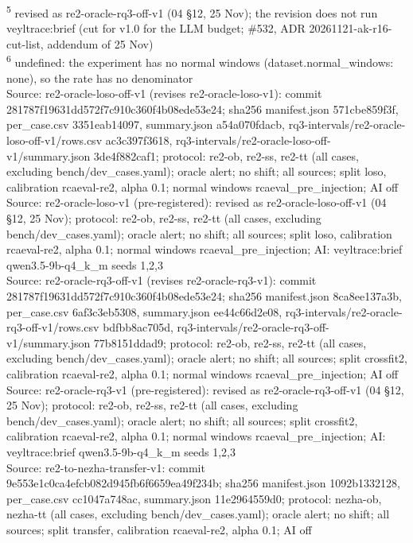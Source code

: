\begin{table}[t]
\textsuperscript{5} revised as re2-oracle-rq3-off-v1 (04 \S{}12, 25 Nov); the revision does not run veyltrace:brief (cut for v1.0 for the LLM budget; \#532, ADR 20261121-ak-r16-cut-list, addendum of 25 Nov)\\
\textsuperscript{6} undefined: the experiment has no normal windows (dataset.normal\_windows: none), so the rate has no denominator\\
Source: re2-oracle-loso-off-v1 (revises re2-oracle-loso-v1): commit 281787f19631dd572f7c910c360f4b08ede53e24; sha256 manifest.json 571cbe859f3f, per\_case.csv 3351eab14097, summary.json a54a070fdacb, rq3-intervals/re2-oracle-loso-off-v1/rows.csv ac3c397f3618, rq3-intervals/re2-oracle-loso-off-v1/summary.json 3de4f882caf1; protocol: re2-ob, re2-ss, re2-tt (all cases, excluding bench/dev\_cases.yaml); oracle alert; no shift; all sources; split loso, calibration rcaeval-re2, alpha 0.1; normal windows rcaeval\_pre\_injection; AI off\\
Source: re2-oracle-loso-v1 (pre-registered): revised as re2-oracle-loso-off-v1 (04 \S{}12, 25 Nov); protocol: re2-ob, re2-ss, re2-tt (all cases, excluding bench/dev\_cases.yaml); oracle alert; no shift; all sources; split loso, calibration rcaeval-re2, alpha 0.1; normal windows rcaeval\_pre\_injection; AI: veyltrace:brief qwen3.5-9b-q4\_k\_m seeds 1,2,3\\
Source: re2-oracle-rq3-off-v1 (revises re2-oracle-rq3-v1): commit 281787f19631dd572f7c910c360f4b08ede53e24; sha256 manifest.json 8ca8ee137a3b, per\_case.csv 6af3c3eb5308, summary.json ee44c66d2e08, rq3-intervals/re2-oracle-rq3-off-v1/rows.csv bdfbb8ac705d, rq3-intervals/re2-oracle-rq3-off-v1/summary.json 77b8151ddad9; protocol: re2-ob, re2-ss, re2-tt (all cases, excluding bench/dev\_cases.yaml); oracle alert; no shift; all sources; split crossfit2, calibration rcaeval-re2, alpha 0.1; normal windows rcaeval\_pre\_injection; AI off\\
Source: re2-oracle-rq3-v1 (pre-registered): revised as re2-oracle-rq3-off-v1 (04 \S{}12, 25 Nov); protocol: re2-ob, re2-ss, re2-tt (all cases, excluding bench/dev\_cases.yaml); oracle alert; no shift; all sources; split crossfit2, calibration rcaeval-re2, alpha 0.1; normal windows rcaeval\_pre\_injection; AI: veyltrace:brief qwen3.5-9b-q4\_k\_m seeds 1,2,3\\
Source: re2-to-nezha-transfer-v1: commit 9e553e1c0ca4efcb082d945fb6f6659ea49f234b; sha256 manifest.json 1092b1332128, per\_case.csv cc1047a748ac, summary.json 11e2964559d0; protocol: nezha-ob, nezha-tt (all cases, excluding bench/dev\_cases.yaml); oracle alert; no shift; all sources; split transfer, calibration rcaeval-re2, alpha 0.1; AI off\\
\end{table}

